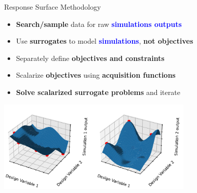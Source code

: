 \documentclass[a0paper,landscape]{baposter}
\newcommand{\BLUE}[1]{\textcolor{blue}{\bf #1}}
\newcommand{\RED}[1]{\textcolor{ArgonneLogoRed}{\bf #1}}
\newcommand{\GREEN}[1]{\textcolor{ArgonneLogoGreen}{\bf #1}}
\begin{document}
\begin{poster}
\begin{posterbox}[name=ampl,column=1,row=0]{Response Surface Methodology}
  \begin{itemize}
    \item \GREEN{Search/sample} data for raw \BLUE{simulations outputs}
    \item Use \GREEN{surrogates} to model \BLUE{simulations}, \RED{not objectives}
    \item Separately define \RED{objectives and constraints}
    \item Scalarize \RED{objectives} using \GREEN{acquisition functions}
    \item \GREEN{Solve scalarized surrogate problems} and iterate
  \end{itemize}
  \begin{center}
  \includegraphics[width=0.7\textwidth]{../img/moo_old/surrogate-models.pdf}
  \end{center}
\end{posterbox}


\end{poster}
\end{document}
